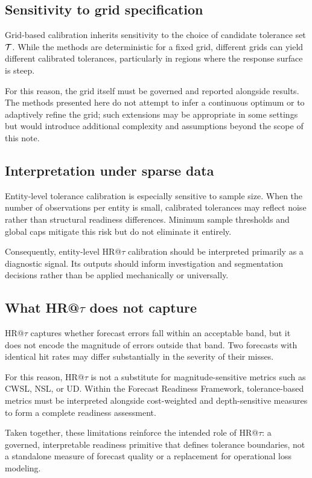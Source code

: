 \subsection{Sensitivity to grid specification}
\label{subsec:grid_sensitivity}

Grid-based calibration inherits sensitivity to the choice of candidate tolerance
set $\mathcal{T}$.
While the methods are deterministic for a fixed grid, different grids can yield
different calibrated tolerances, particularly in regions where the response
surface is steep.

For this reason, the grid itself must be governed and reported alongside results.
The methods presented here do not attempt to infer a continuous optimum or to
adaptively refine the grid; such extensions may be appropriate in some settings
but would introduce additional complexity and assumptions beyond the scope of
this note.

\subsection{Interpretation under sparse data}
\label{subsec:sparse_data}

Entity-level tolerance calibration is especially sensitive to sample size.
When the number of observations per entity is small, calibrated tolerances may
reflect noise rather than structural readiness differences.
Minimum sample thresholds and global caps mitigate this risk but do not eliminate
it entirely.

Consequently, entity-level HR@$\tau$ calibration should be interpreted primarily
as a diagnostic signal.
Its outputs should inform investigation and segmentation decisions rather than be
applied mechanically or universally.

\subsection{What HR@$\tau$ does not capture}
\label{subsec:not_capture}

HR@$\tau$ captures whether forecast errors fall within an acceptable band, but it
does not encode the magnitude of errors outside that band.
Two forecasts with identical hit rates may differ substantially in the severity
of their misses.

For this reason, HR@$\tau$ is not a substitute for magnitude-sensitive metrics
such as CWSL, NSL, or UD.
Within the Forecast Readiness Framework, tolerance-based metrics must be
interpreted alongside cost-weighted and depth-sensitive measures to form a
complete readiness assessment.

Taken together, these limitations reinforce the intended role of HR@$\tau$:
a governed, interpretable readiness primitive that defines tolerance boundaries,
not a standalone measure of forecast quality or a replacement for operational
loss modeling.
